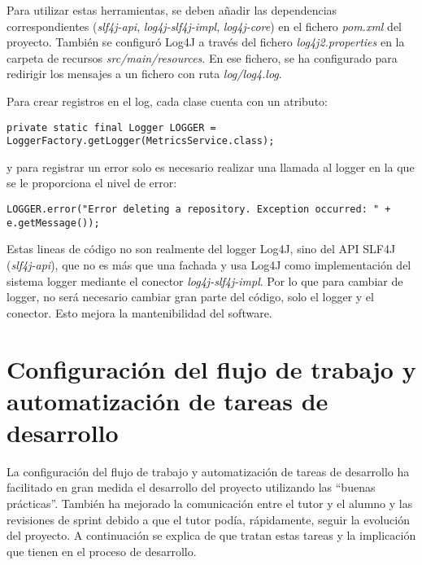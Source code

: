 Para utilizar estas herramientas, se deben añadir las dependencias correspondientes (\textit{slf4j-api}, \textit{log4j-slf4j-impl}, \textit{log4j-core}) en el fichero \textit{pom.xml} del proyecto. También se configuró Log4J a través del fichero \textit{log4j2.properties} en la carpeta de recursos \textit{src/main/resources}. En ese fichero, se ha configurado para redirigir los mensajes a un fichero con ruta \textit{log/log4.log}.

Para crear registros en el log, cada clase cuenta con un atributo:\\
\begin{minipage}{\linewidth}
{\tiny
\begin{lstlisting}[breaklines]
private static final Logger LOGGER = LoggerFactory.getLogger(MetricsService.class);
\end{lstlisting}
}
\end{minipage}
y para registrar un error solo es necesario realizar una llamada al logger en la que se le proporciona el nivel de error:\\
\begin{minipage}{\linewidth}
{\tiny
\begin{lstlisting}[breaklines]
LOGGER.error("Error deleting a repository. Exception occurred: " + e.getMessage());
\end{lstlisting}
}
\end{minipage}

Estas lineas de código no son realmente del logger Log4J, sino del API SLF4J (\textit{slf4j-api}), que no es más que una fachada y usa Log4J como implementación del sistema logger mediante el conector \textit{log4j-slf4j-impl}. Por lo que para cambiar de logger, no será necesario cambiar gran parte del código, solo el logger y el conector. Esto mejora la mantenibilidad del software.

\section{Configuración del flujo de trabajo y automatización de tareas de desarrollo}

La configuración del flujo de trabajo y automatización de tareas de desarrollo ha facilitado en gran medida el desarrollo del proyecto utilizando las ``buenas prácticas''. También ha mejorado la comunicación entre el tutor y el alumno y las revisiones de sprint debido a que el tutor podía, rápidamente, seguir la evolución del proyecto. A continuación se explica de que tratan estas tareas y la implicación que tienen en el proceso de desarrollo.

